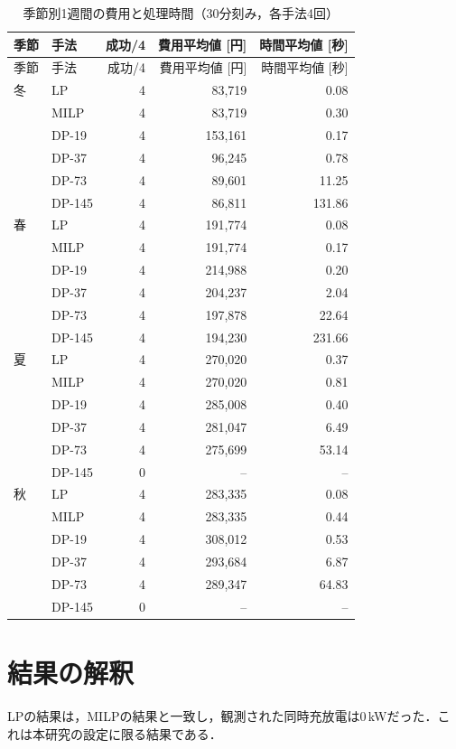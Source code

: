 \documentclass[a4paper,11pt,xelatex,ja=standard]{bxjsarticle}
\begin{document}
\begingroup
\small
\setlength{\tabcolsep}{3pt}
\begin{longtable}{llrrr}
    \caption{季節別1週間の費用と処理時間（30分刻み，各手法4回）}\label{tab:season} \\
    \toprule
    季節 & 手法     & 成功/4 & 費用平均値 [円] & 時間平均値 [秒]              \\
    \midrule
    \endfirsthead
    \toprule
    季節 & 手法     & 成功/4 & 費用平均値 [円] & 時間平均値 [秒]              \\
    \midrule
    \endhead
    冬  & LP     & 4    & 83,719    & 0.08                   \\
       & MILP   & 4    & 83,719    & 0.30                   \\
       & DP-19  & 4    & 153,161   & 0.17                   \\
       & DP-37  & 4    & 96,245    & 0.78                   \\
       & DP-73  & 4    & 89,601    & 11.25                  \\
       & DP-145 & 4    & 86,811    & 131.86                 \\
    \midrule
    春  & LP     & 4    & 191,774   & 0.08                   \\
       & MILP   & 4    & 191,774   & 0.17                   \\
       & DP-19  & 4    & 214,988   & 0.20                   \\
       & DP-37  & 4    & 204,237   & 2.04                   \\
       & DP-73  & 4    & 197,878   & 22.64                  \\
       & DP-145 & 4    & 194,230   & 231.66                 \\
    \midrule
    夏  & LP     & 4    & 270,020   & 0.37                   \\
       & MILP   & 4    & 270,020   & 0.81                   \\
       & DP-19  & 4    & 285,008   & 0.40                   \\
       & DP-37  & 4    & 281,047   & 6.49                   \\
       & DP-73  & 4    & 275,699   & 53.14                  \\
       & DP-145 & 0    & --        & --                     \\
    \midrule
    秋  & LP     & 4    & 283,335   & 0.08                   \\
       & MILP   & 4    & 283,335   & 0.44                   \\
       & DP-19  & 4    & 308,012   & 0.53                   \\
       & DP-37  & 4    & 293,684   & 6.87                   \\
       & DP-73  & 4    & 289,347   & 64.83                  \\
       & DP-145 & 0    & --        & --                     \\
    \bottomrule
\end{longtable}
\endgroup

\section{結果の解釈}
LPの結果は，MILPの結果と一致し，観測された同時充放電は0\,kWだった．これは本研究の設定に限る結果である．
\end{document}
